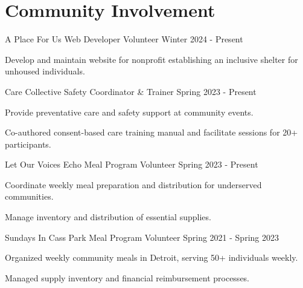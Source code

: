 \documentclass{../styles/cv}
\begin{document}
\section{Community Involvement}

\subsectionpositiondate
    {A Place For Us}
    {Web Developer Volunteer}
    {Winter 2024 - Present}
\resumesublistbegin
    \item Develop and maintain website for nonprofit establishing an inclusive shelter for unhoused individuals.
\resumesublistend

\subsectionpositiondate
    {Care Collective}
    {Safety Coordinator \& Trainer}
    {Spring 2023 - Present}
\resumesublistbegin
    \item Provide preventative care and safety support at community events.
    \item Co-authored consent-based care training manual and facilitate sessions for 20+ participants.
\resumesublistend

\subsectionpositiondate
    {Let Our Voices Echo}
    {Meal Program Volunteer}
    {Spring 2023 - Present}
\resumesublistbegin
    \item Coordinate weekly meal preparation and distribution for underserved communities.
    \item Manage inventory and distribution of essential supplies.
\resumesublistend

\subsectionpositiondate
    {Sundays In Cass Park}
    {Meal Program Volunteer}
    {Spring 2021 - Spring 2023}
\resumesublistbegin
    \item Organized weekly community meals in Detroit, serving 50+ individuals weekly.
    \item Managed supply inventory and financial reimbursement processes.
\resumesublistend
\end{document}
